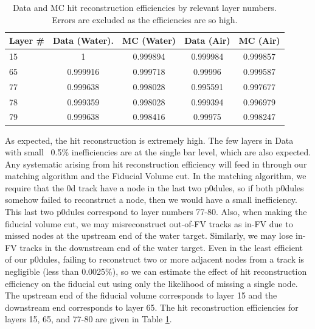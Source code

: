 \begin{table}
\centering
\begin{tabular}{lcccc}\toprule\midrule
Layer \# &  Data (Water). & MC (Water) & Data (Air) & MC (Air)  \\ \midrule
15 & 1 & 0.999894 & 0.999984 & 0.999857 \\ \midrule
65 & 0.999916 & 0.999718 & 0.99996 & 0.999587 \\ \midrule
77 & 0.999638 & 0.998028 & 0.995591 & 0.997677 \\ \midrule
78 & 0.999359 & 0.998028 & 0.999394 & 0.996979 \\ \midrule
79 & 0.999638 & 0.998416 & 0.99975 & 0.998247 \\ \midrule
\bottomrule
\end{tabular}
\caption{Data and MC hit reconstruction efficiencies by relevant layer numbers. Errors are excluded as the efficiencies are so high. }
\label{tab:hiteff}
\end{table}


As expected, the hit reconstruction is extremely high. The few layers in Data with small ~0.5\% inefficiencies are at the single bar level, which are also expected. Any systematic arising from hit reconstruction efficiency will feed in through our matching algorithm and the Fiducial Volume cut. In the matching algorithm, we require that the \p0d track have a node in the last two p0dules, so if both p0dules somehow failed to reconstruct a node, then we would have a small inefficiency. This last two p0dules correspond to layer numbers 77-80. Also, when making the fiducial volume cut, we may misreconstruct out-of-FV tracks as in-FV due to missed nodes at the upstream end of the water target. Similarly, we may lose in-FV tracks in the downstream end of the water target. Even in the least efficient of our p0dules, failing to reconstruct two or more adjacent nodes from a track is negligible (less than 0.0025\%), so we can estimate the effect of hit reconstruction efficiency on the fiducial cut using only the likelihood of missing a single node. The upstream end of the fiducial volume corresponds to layer 15 and the downstream end corresponds to layer 65. The hit reconstruction efficiencies for layers 15, 65, and 77-80 are given in Table \ref{tab:hiteff}.

